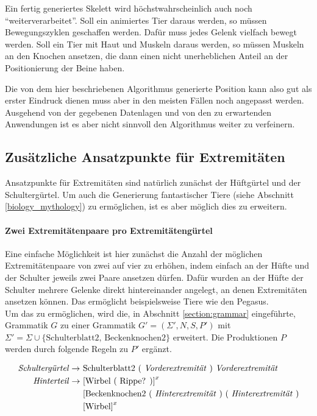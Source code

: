 Ein fertig generiertes Skelett wird höchstwahrscheinlich auch noch "`weiterverarbeitet"'. Soll \zb ein animiertes Tier daraus werden, so müssen Bewegungszyklen geschaffen werden. Dafür muss jedes Gelenk vielfach bewegt werden. Soll ein Tier mit Haut und Muskeln daraus werden, so müssen Muskeln an den Knochen ansetzen, die dann einen nicht unerheblichen Anteil an der Positionierung der Beine haben.

Die von dem hier beschriebenen Algorithmus generierte Position kann also gut als erster Eindruck dienen muss aber in den meisten Fällen noch angepasst werden. Ausgehend von der gegebenen Datenlagen und von den zu erwartenden Anwendungen ist es aber nicht sinnvoll den Algorithmus weiter zu verfeinern.

\subsection{Zusätzliche Ansatzpunkte für Extremitäten}

Ansatzpunkte für Extremitäten sind natürlich zunächst der Hüftgürtel und der Schultergürtel. Um auch die Generierung fantastischer Tiere (siehe Abschnitt \ref{biology_mythology}) zu ermöglichen, ist es aber möglich dies zu erweitern.

\paragraph{Zwei Extremitätenpaare pro Extremitätengürtel}
Eine einfache Möglichkeit ist hier zunächst die Anzahl der möglichen Extremitätenpaare von zwei auf vier zu erhöhen, indem einfach an der Hüfte und der Schulter jeweils zwei Paare ansetzen dürfen. Dafür wurden an der Hüfte \bzw der Schulter mehrere Gelenke direkt hintereinander angelegt, an denen Extremitäten ansetzen können. Das ermöglicht beispielsweise Tiere wie den Pegasus.\\
Um das zu ermöglichen, wird die, in Abschnitt \ref{section:grammar} eingeführte, Grammatik $G$ zu einer Grammatik $G' = (\Sigma', N, S, P')$ mit $\Sigma' = \Sigma \cup \{\text{Schulterblatt2, Beckenknochen2}\}$ erweitert. Die Produktionen $P$ werden durch folgende Regeln zu $P'$ ergänzt.

\begin{align*}
 \text{\emph{Schultergürtel}} \rightarrow &\text{ Schulterblatt2 ( \emph{Vorderextremität} ) \emph{Vorderextremität}}\\
 \text{\emph{Hinterteil}} \rightarrow &\text{ [Wirbel ( Rippe? )]}^x\\
    &\text{ [Beckenknochen2 ( \emph{Hinterextremität} ) ( \emph{Hinterextremität} )}\\
    &\text{ [Wirbel]}^x
\end{align*}

